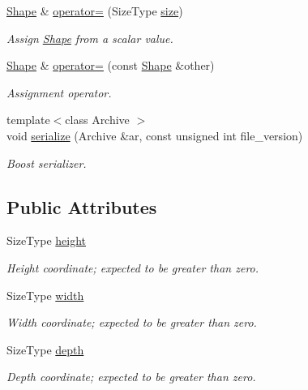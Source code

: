 \begin{DoxyCompactItemize}
\hyperlink{structffnn_1_1layer_1_1_shape}{Shape} \& \hyperlink{structffnn_1_1layer_1_1_shape_abb7c4a95e452d41b2d837b1eaa21cd7a}{operator=} (Size\-Type \hyperlink{structffnn_1_1layer_1_1_shape_a6e8ffdbc3feeb20a1f246b3ec56e40ca}{size})
\begin{DoxyCompactList}\small\item\em Assign \hyperlink{structffnn_1_1layer_1_1_shape}{Shape} from a scalar value. \end{DoxyCompactList}\item 
\hyperlink{structffnn_1_1layer_1_1_shape}{Shape} \& \hyperlink{structffnn_1_1layer_1_1_shape_ab5c5fa4a73bc8036e72f79f2fcd0b793}{operator=} (const \hyperlink{structffnn_1_1layer_1_1_shape}{Shape} \&other)
\begin{DoxyCompactList}\small\item\em Assignment operator. \end{DoxyCompactList}\item 
{\footnotesize template$<$class Archive $>$ }\\void \hyperlink{structffnn_1_1layer_1_1_shape_a53fc6b96338bf4f87d9b2736a40cb172}{serialize} (Archive \&ar, const unsigned int file\-\_\-version)
\begin{DoxyCompactList}\small\item\em Boost serializer. \end{DoxyCompactList}\end{DoxyCompactItemize}
\subsection*{Public Attributes}
\begin{DoxyCompactItemize}
\item 
Size\-Type \hyperlink{structffnn_1_1layer_1_1_shape_a96608d7bcef7733a1b1f4782827a0c78}{height}
\begin{DoxyCompactList}\small\item\em Height coordinate; expected to be greater than zero. \end{DoxyCompactList}\item 
Size\-Type \hyperlink{structffnn_1_1layer_1_1_shape_a860cbac53d9e20bdf8283298c6369cbc}{width}
\begin{DoxyCompactList}\small\item\em Width coordinate; expected to be greater than zero. \end{DoxyCompactList}\item 
Size\-Type \hyperlink{structffnn_1_1layer_1_1_shape_a37ec3deb8c9f2d6617e6f63799c0fcbf}{depth}
\begin{DoxyCompactList}\small\item\em Depth coordinate; expected to be greater than zero. \end{DoxyCompactList}\end{DoxyCompactItemize}


